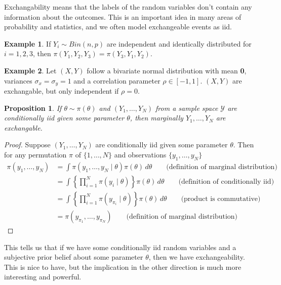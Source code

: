 \documentclass[
]{book}
\newtheorem{proposition}{Proposition}[chapter]
\theoremstyle{definition}
\theoremstyle{definition}
\newtheorem{example}{Example}[chapter]
\theoremstyle{definition}
\theoremstyle{definition}
\theoremstyle{remark}
\begin{document}
Exchangability means that the labels of the random variables don't contain any information about the outcomes. This is an important idea in many areas of probability and statistics, and we often model exchangeable events as iid.

\begin{example}
If \(Y_i \sim Bin(n, p)\) are independent and identically distributed for \(i = 1, 2, 3\), then \(\pi(Y_1, Y_2, Y_3) = \pi(Y_3, Y_1, Y_2)\).
\end{example}

\begin{example}
Let \((X, Y)\) follow a bivariate normal distribution with mean \textbf{0}, variances \(\sigma_x = \sigma_y = 1\) and a correlation parameter \(\rho \in [-1, 1]\). \((X, Y)\) are exchangable, but only independent if \(\rho = 0\).
\end{example}

\begin{proposition}
If \(\theta \sim \pi(\theta)\) and \((Y_1, \ldots, Y_N)\) from a sample space \(\mathcal{Y}\) are conditionally iid given some parameter \(\theta\), then marginally \(Y_1, \ldots, Y_N\) are exchangable.
\end{proposition}

\begin{proof}
Suppose \((Y_1, \ldots, Y_N)\) are conditionally iid given some parameter \(\theta\). Then for any permutation \(\pi\) of \(\{1, \ldots, N\}\) and observations \(\{y_1, \ldots, y_N\}\)
\begin{equation}
\begin{split}
\pi(y_1, \ldots, y_N) &= \int \pi(y_1, \ldots, y_N \mid \theta) \pi(\theta)\, d\theta \qquad \textrm{(definition of marginal distribution)}\\
 & = \int \left\{\prod_{i=1}^N\pi(y_i \mid \theta)\right\} \pi(\theta)\, d\theta \qquad \textrm{(definition of conditionally iid)}\\
& = \int \left\{\prod_{i=1}^N\pi(y_{\pi_i} \mid \theta)\right\} \pi(\theta)\, d\theta \qquad \textrm{(product is commutative)} \\
 & = \pi(y_{\pi_1}, \ldots, y_{\pi_N}) \qquad \textrm{(definition of marginal distribution)}
\end{split}
\end{equation}
\end{proof}

This tells us that if we have some conditionally iid random variables and a subjective prior belief about some parameter \(\theta\), then we have exchangeability. This is nice to have, but the implication in the other direction is much more interesting and powerful.
\end{document}
